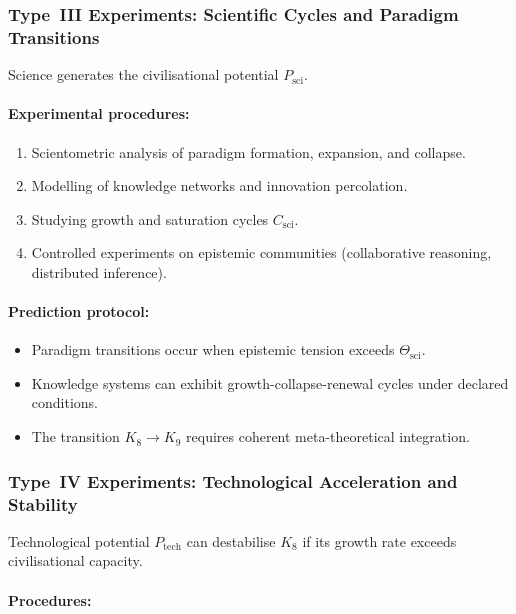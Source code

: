 \subsubsection{Type~III Experiments: Scientific Cycles and Paradigm Transitions}

Science generates the civilisational potential $P_{\mathrm{sci}}$.

\paragraph{Experimental procedures:}

\begin{enumerate}
    \item Scientometric analysis of paradigm formation, expansion, and collapse.
    \item Modelling of knowledge networks and innovation percolation.
    \item Studying growth and saturation cycles $C_{\mathrm{sci}}$.
    \item Controlled experiments on epistemic communities
          (collaborative reasoning, distributed inference).
\end{enumerate}

\paragraph{Prediction protocol:}

\begin{itemize}
    \item Paradigm transitions occur when epistemic tension exceeds
          $\Theta_{\mathrm{sci}}$.
    \item Knowledge systems can exhibit growth-collapse-renewal cycles under declared conditions.
    \item The transition $K_8 \to K_9$ requires coherent meta-theoretical integration.
\end{itemize}



\subsubsection{Type~IV Experiments: Technological Acceleration and Stability}

Technological potential $P_{\mathrm{tech}}$ can destabilise $K_8$
if its growth rate exceeds civilisational capacity.

\paragraph{Procedures:}

